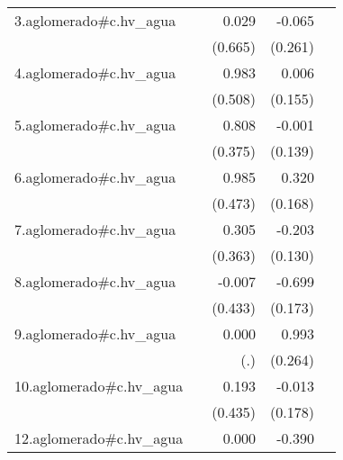 {\begin{longtable}{l*{4}{D{.}{.}{-1}}}
\addlinespace
3.aglomerado#c.hv\_agua&                     &       0.029         &      -0.065         &                     \\
            &                     &     (0.665)         &     (0.261)         &                     \\
\addlinespace
4.aglomerado#c.hv\_agua&                     &       0.983         &       0.006         &                     \\
            &                     &     (0.508)         &     (0.155)         &                     \\
\addlinespace
5.aglomerado#c.hv\_agua&                     &       0.808\sym{*}  &      -0.001         &                     \\
            &                     &     (0.375)         &     (0.139)         &                     \\
\addlinespace
6.aglomerado#c.hv\_agua&                     &       0.985\sym{*}  &       0.320         &                     \\
            &                     &     (0.473)         &     (0.168)         &                     \\
\addlinespace
7.aglomerado#c.hv\_agua&                     &       0.305         &      -0.203         &                     \\
            &                     &     (0.363)         &     (0.130)         &                     \\
\addlinespace
8.aglomerado#c.hv\_agua&                     &      -0.007         &      -0.699\sym{***}&                     \\
            &                     &     (0.433)         &     (0.173)         &                     \\
\addlinespace
9.aglomerado#c.hv\_agua&                     &       0.000         &       0.993\sym{***}&                     \\
            &                     &         (.)         &     (0.264)         &                     \\
\addlinespace
10.aglomerado#c.hv\_agua&                     &       0.193         &      -0.013         &                     \\
            &                     &     (0.435)         &     (0.178)         &                     \\
\addlinespace
12.aglomerado#c.hv\_agua&                     &       0.000         &      -0.390\sym{*}  &                     \\

\end{longtable}}
